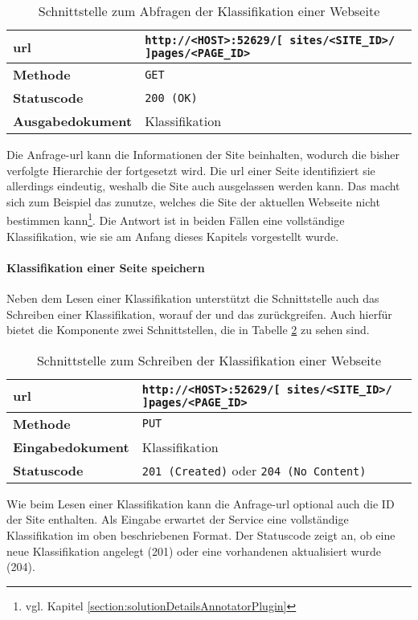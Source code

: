     \begin{table}[htb]
        \centering
        \begin{tabular}{|l|l|}
        \hline
        \textbf{\gls{url}} & \texttt{http://<HOST>:52629/[ sites/<SITE\_ID>/ ]pages/<PAGE\_ID>}\\
        \hline
        \textbf{Methode} & \texttt{GET}\\
        \hline
        \textbf{Statuscode} & \texttt{200 (OK)}\\
        \hline
        \textbf{Ausgabedokument} & Klassifikation\\
        \hline
        \end{tabular}
        \caption{Schnittstelle zum Abfragen der Klassifikation einer Webseite}
        \label{table:getFullPageInterface}
    \end{table}

    Die Anfrage-\gls{url} kann die Informationen der Site beinhalten,
    wodurch die bisher verfolgte Hierarchie der {\resources} fortgesetzt wird.
    Die \gls{url} einer Seite identifiziert sie allerdings eindeutig,
    weshalb die Site auch ausgelassen werden kann.
    Das macht sich zum Beispiel das {\annotatorPlugin} zunutze,
    welches die Site der aktuellen Webseite nicht bestimmen
    kann\footnote{vgl. Kapitel \ref{section:solutionDetailsAnnotatorPlugin}}.
    Die Antwort ist in beiden Fällen eine vollständige Klassifikation,
    wie sie am Anfang dieses Kapitels vorgestellt wurde.

    \paragraph{Klassifikation einer Seite speichern}
    Neben dem Lesen einer Klassifikation unterstützt die Schnittstelle auch das Schreiben einer Klassifikation,
    worauf der {\classificationService} und das {\annotatorPlugin} zurückgreifen.
    Auch hierfür bietet die Komponente zwei Schnittstellen, die in Tabelle \ref{table:writePageInterface} zu sehen sind.

    \begin{table}[htb]
        \centering
        \begin{tabular}{|l|l|}
        \hline
        \textbf{\gls{url}} & \texttt{http://<HOST>:52629/[ sites/<SITE\_ID>/ ]pages/<PAGE\_ID>}\\
        \hline
        \textbf{Methode} & \texttt{PUT}\\
        \hline
        \textbf{Eingabedokument} & Klassifikation\\
        \hline
        \textbf{Statuscode} & \texttt{201 (Created)} oder \texttt{204 (No Content)}\\
        \hline
        \end{tabular}
        \caption{Schnittstelle zum Schreiben der Klassifikation einer Webseite}
        \label{table:writePageInterface}
    \end{table}

    Wie beim Lesen einer Klassifikation kann die Anfrage-\gls{url} optional auch die ID der Site enthalten.
    Als Eingabe erwartet der Service eine vollständige Klassifikation im oben beschriebenen Format.
    Der Statuscode zeigt an, ob eine neue Klassifikation angelegt (201) oder eine vorhandenen aktualisiert wurde (204).
